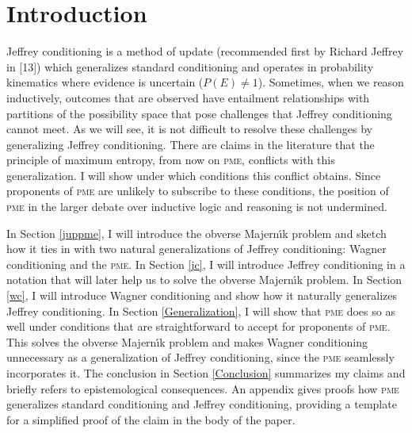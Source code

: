 \documentclass[entropy,article,submit,oneauthor,pdftex,12pt,a4paper]{mdpi}
\begin{document}





\section{Introduction}
\label{Introduction}

Jeffrey conditioning is a method of update (recommended first by
Richard Jeffrey in [13]) which generalizes standard conditioning and
operates in probability kinematics where evidence is uncertain
($P(E)\neq{}1$). Sometimes, when we reason inductively, outcomes that
are observed have entailment relationships with partitions of the
possibility space that pose challenges that Jeffrey conditioning
cannot meet. As we will see, it is not difficult to resolve these
challenges by generalizing Jeffrey conditioning. There are claims in
the literature that the principle of maximum entropy, from now on
\textsc{pme}, conflicts with this generalization. I will show under
which conditions this conflict obtains. Since proponents of
\textsc{pme} are unlikely to subscribe to these conditions, the
position of \textsc{pme} in the larger debate over inductive logic and
reasoning is not undermined.

In Section \ref{juppme}, I will introduce the obverse Majern{\'\i}k
problem and sketch how it ties in with two natural generalizations of
Jeffrey conditioning: Wagner conditioning and the \textsc{pme}. In
Section \ref{jc}, I will introduce Jeffrey conditioning in a notation
that will later help us to solve the obverse Majern{\'\i}k problem. In
Section \ref{wc}, I will introduce Wagner conditioning and show how it
naturally generalizes Jeffrey conditioning. In Section
\ref{Generalization}, I will show that \textsc{pme} does so as well
under conditions that are straightforward to accept for proponents of
\textsc{pme}. This solves the obverse Majern{\'\i}k problem and makes
Wagner conditioning unnecessary as a generalization of Jeffrey
conditioning, since the \textsc{pme} seamlessly incorporates it. The
conclusion in Section \ref{Conclusion} summarizes my claims and
briefly refers to epistemological consequences. An appendix gives
proofs how \textsc{pme} generalizes standard conditioning and Jeffrey
conditioning, providing a template for a simplified proof of the claim
in the body of the paper.
\end{document}

